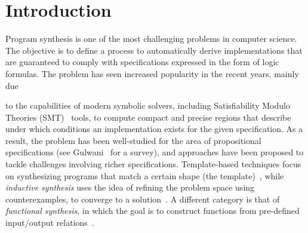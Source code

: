 
\section{Introduction}

Program synthesis is one of the most challenging problems in computer science. The objective is to define a process to automatically derive implementations that are guaranteed to comply with specifications expressed in the form of logic formulas. The problem has seen increased popularity in the recent years, mainly due
\iffalse
 Program synthesis owes its origins to Church~\cite{church1962logic} (otherwise known as Church's Problem), and has long been an important area of research.
%
%
After the seminal paper by Pnueli and Rosner~\cite{pnueli1989synthesis} on reactive synthesis, the problem has seen increased popularity 
\grigory{Actually, the synthesis got popular after the death of Pnueli. Pnueli himself was very skeptical about this idea.}
\fi
to the capabilities of modern symbolic solvers, including Satisfiability Modulo Theories (SMT)~\cite{BarFT-SMTLIB} tools, to compute compact and precise regions that describe under which conditions an implementation exists for the given specification.
 As a result, the problem has been well-studied for the area of propositional specifications (see Gulwani~\cite{gulwani2010dimensions} for a survey), and approaches have been proposed to tackle challenges involving richer specifications. Template-based techniques focus on synthesizing programs that
match a certain shape (the template)~\cite{srivastava2013template}, while {\em inductive synthesis} uses the idea of refining the problem space using counterexamples, to converge to a solution~\cite{flener2001inductive}. 
A different category is that of \textit{functional synthesis}, in which the goal is to construct functions from pre-defined input/output relations~\cite{kuncak2013functional}.

